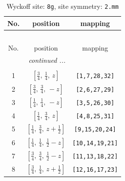 \documentclass[fleqn,8pt]{jsarticle}
\begin{document}
\begin{longtable}{ccc}
\caption{Wyckoff site: {\tt 8g}, site symmetry: {\tt 2.mm}}
 \\
 \hline \hline
No. & position & mapping \\ \hline \endfirsthead

\multicolumn{2}{l}{\tablename\ \thetable{}} \\
 \hline \hline
No. & position & mapping \\ \hline \endhead

 \hline \hline
\multicolumn{2}{r}{\footnotesize\it continued ...} \\ \endfoot

 \hline \hline
\multicolumn{2}{r}{} \\ \endlastfoot

1 & $\left[ \frac{3}{4},\, \frac{1}{4},\, z \right]$ & {\tt [1,7,28,32]} \\ \hline
2 & $\left[ \frac{3}{4},\, \frac{3}{4},\, - z \right]$ & {\tt [2,6,27,29]} \\ \hline
3 & $\left[ \frac{1}{4},\, \frac{1}{4},\, - z \right]$ & {\tt [3,5,26,30]} \\ \hline
4 & $\left[ \frac{1}{4},\, \frac{3}{4},\, z \right]$ & {\tt [4,8,25,31]} \\ \hline
5 & $\left[ \frac{1}{4},\, \frac{3}{4},\, z + \frac{1}{2} \right]$ & {\tt [9,15,20,24]} \\ \hline
6 & $\left[ \frac{1}{4},\, \frac{1}{4},\, \frac{1}{2} - z \right]$ & {\tt [10,14,19,21]} \\ \hline
7 & $\left[ \frac{3}{4},\, \frac{3}{4},\, \frac{1}{2} - z \right]$ & {\tt [11,13,18,22]} \\ \hline
8 & $\left[ \frac{3}{4},\, \frac{1}{4},\, z + \frac{1}{2} \right]$ & {\tt [12,16,17,23]} \\
\end{longtable}
\renewcommand{\arraystretch}{1.2}
\end{document}
